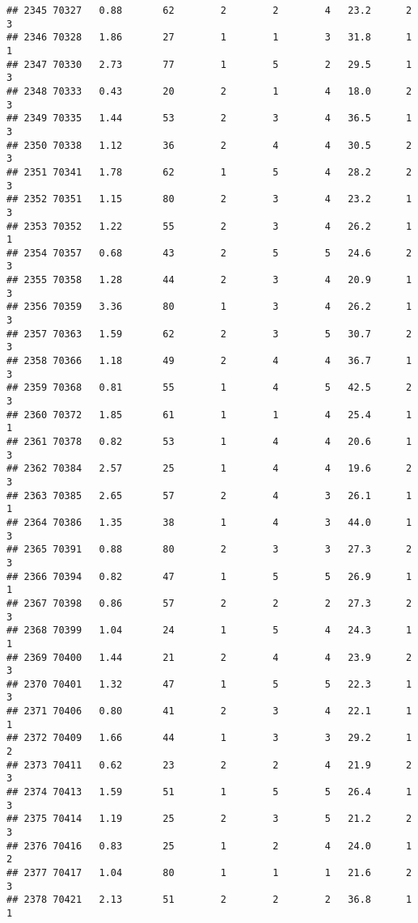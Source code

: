 \documentclass[
]{article}
\begin{document}
\begin{verbatim}
## 2345 70327   0.88       62        2        2        4   23.2      2      3
## 2346 70328   1.86       27        1        1        3   31.8      1      1
## 2347 70330   2.73       77        1        5        2   29.5      1      3
## 2348 70333   0.43       20        2        1        4   18.0      2      3
## 2349 70335   1.44       53        2        3        4   36.5      1      3
## 2350 70338   1.12       36        2        4        4   30.5      2      3
## 2351 70341   1.78       62        1        5        4   28.2      2      3
## 2352 70351   1.15       80        2        3        4   23.2      1      3
## 2353 70352   1.22       55        2        3        4   26.2      1      1
## 2354 70357   0.68       43        2        5        5   24.6      2      3
## 2355 70358   1.28       44        2        3        4   20.9      1      3
## 2356 70359   3.36       80        1        3        4   26.2      1      3
## 2357 70363   1.59       62        2        3        5   30.7      2      3
## 2358 70366   1.18       49        2        4        4   36.7      1      3
## 2359 70368   0.81       55        1        4        5   42.5      2      3
## 2360 70372   1.85       61        1        1        4   25.4      1      1
## 2361 70378   0.82       53        1        4        4   20.6      1      3
## 2362 70384   2.57       25        1        4        4   19.6      2      3
## 2363 70385   2.65       57        2        4        3   26.1      1      1
## 2364 70386   1.35       38        1        4        3   44.0      1      3
## 2365 70391   0.88       80        2        3        3   27.3      2      3
## 2366 70394   0.82       47        1        5        5   26.9      1      1
## 2367 70398   0.86       57        2        2        2   27.3      2      3
## 2368 70399   1.04       24        1        5        4   24.3      1      1
## 2369 70400   1.44       21        2        4        4   23.9      2      3
## 2370 70401   1.32       47        1        5        5   22.3      1      3
## 2371 70406   0.80       41        2        3        4   22.1      1      1
## 2372 70409   1.66       44        1        3        3   29.2      1      2
## 2373 70411   0.62       23        2        2        4   21.9      2      3
## 2374 70413   1.59       51        1        5        5   26.4      1      3
## 2375 70414   1.19       25        2        3        5   21.2      2      3
## 2376 70416   0.83       25        1        2        4   24.0      1      2
## 2377 70417   1.04       80        1        1        1   21.6      2      3
## 2378 70421   2.13       51        2        2        2   36.8      1      1

\end{verbatim}
\end{document}
